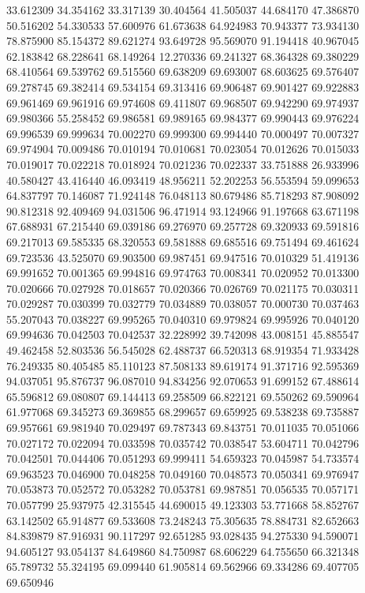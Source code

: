 33.612309
34.354162
33.317139
30.404564
41.505037
44.684170
47.386870
50.516202
54.330533
57.600976
61.673638
64.924983
70.943377
73.934130
78.875900
85.154372
89.621274
93.649728
95.569070
91.194418
40.967045
62.183842
68.228641
68.149264
12.270336
69.241327
68.364328
69.380229
68.410564
69.539762
69.515560
69.638209
69.693007
68.603625
69.576407
69.278745
69.382414
69.534154
69.313416
69.906487
69.901427
69.922883
69.961469
69.961916
69.974608
69.411807
69.968507
69.942290
69.974937
69.980366
55.258452
69.986581
69.989165
69.984377
69.990443
69.976224
69.996539
69.999634
70.002270
69.999300
69.994440
70.000497
70.007327
69.974904
70.009486
70.010194
70.010681
70.023054
70.012626
70.015033
70.019017
70.022218
70.018924
70.021236
70.022337
33.751888
26.933996
40.580427
43.416440
46.093419
48.956211
52.202253
56.553594
59.099653
64.837797
70.146087
71.924148
76.048113
80.679486
85.718293
87.908092
90.812318
92.409469
94.031506
96.471914
93.124966
91.197668
63.671198
67.688931
67.215440
69.039186
69.276970
69.257728
69.320933
69.591816
69.217013
69.585335
68.320553
69.581888
69.685516
69.751494
69.461624
69.723536
43.525070
69.903500
69.987451
69.947516
70.010329
51.419136
69.991652
70.001365
69.994816
69.974763
70.008341
70.020952
70.013300
70.020666
70.027928
70.018657
70.020366
70.026769
70.021175
70.030311
70.029287
70.030399
70.032779
70.034889
70.038057
70.000730
70.037463
55.207043
70.038227
69.995265
70.040310
69.979824
69.995926
70.040120
69.994636
70.042503
70.042537
32.228992
39.742098
43.008151
45.885547
49.462458
52.803536
56.545028
62.488737
66.520313
68.919354
71.933428
76.249335
80.405485
85.110123
87.508133
89.619174
91.371716
92.595369
94.037051
95.876737
96.087010
94.834256
92.070653
91.699152
67.488614
65.596812
69.080807
69.144413
69.258509
66.822121
69.550262
69.590964
61.977068
69.345273
69.369855
68.299657
69.659925
69.538238
69.735887
69.957661
69.981940
70.029497
69.787343
69.843751
70.011035
70.051066
70.027172
70.022094
70.033598
70.035742
70.038547
53.604711
70.042796
70.042501
70.044406
70.051293
69.999411
54.659323
70.045987
54.733574
69.963523
70.046900
70.048258
70.049160
70.048573
70.050341
69.976947
70.053873
70.052572
70.053282
70.053781
69.987851
70.056535
70.057171
70.057799
25.937975
42.315545
44.690015
49.123303
53.771668
58.852767
63.142502
65.914877
69.533608
73.248243
75.305635
78.884731
82.652663
84.839879
87.916931
90.117297
92.651285
93.028435
94.275330
94.590071
94.605127
93.054137
84.649860
84.750987
68.606229
64.755650
66.321348
65.789732
55.324195
69.099440
61.905814
69.562966
69.334286
69.407705
69.650946
